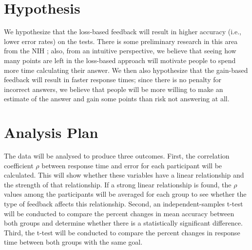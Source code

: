 \documentclass[12pt]{exam}
\begin{document}

\section{Hypothesis}
We hypothesize that the loss-based feedback will result in higher accuracy (i.e., lower error rates) on the tests. There is some preliminary research in this area from the NIH \cite{nih-paper}; also, from an intuitive perspective, we believe that seeing how many points are left in the loss-based approach will motivate people to spend more time calculating their answer. We then also hypothesize that the gain-based feedback will result in faster response times; since there is no penalty for incorrect answers, we believe that people will be more willing to make an estimate of the answer and gain some points than risk not answering at all.

\section{Analysis Plan}
The data will be analysed to produce three outcomes. First, the correlation coefficient $\rho$ between response time and error for each participant will be calculated. This will show whether these variables have a linear relationship and the strength of that relationship. If a strong linear relationship is found, the $\rho$ values among the participants will be averaged for each group to see whether the type of feedback affects this relationship. Second, an independent-samples t-test \cite{t-tests} will be conducted to compare the percent changes in mean accuracy between both groups and determine whether there is a statistically significant difference. Third, the t-test will be conducted to compare the percent changes in response time between both groups with the same goal.

\medskip\newpage
\printbibliography
\end{document}
